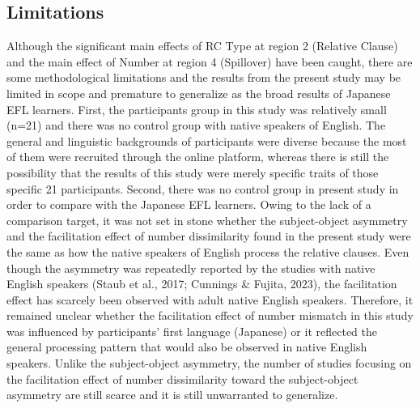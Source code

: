 \documentclass[
]{article}
\begin{document}
\subsection{Limitations}\label{limitations}

Although the significant main effects of RC Type at region 2 (Relative
Clause) and the main effect of Number at region 4 (Spillover) have been
caught, there are some methodological limitations and the results from
the present study may be limited in scope and premature to generalize as
the broad results of Japanese EFL learners. First, the participants
group in this study was relatively small (n=21) and there was no control
group with native speakers of English. The general and linguistic
backgrounds of participants were diverse because the most of them were
recruited through the online platform, whereas there is still the
possibility that the results of this study were merely specific traits
of those specific 21 participants. Second, there was no control group in
present study in order to compare with the Japanese EFL learners. Owing
to the lack of a comparison target, it was not set in stone whether the
subject-object asymmetry and the facilitation effect of number
dissimilarity found in the present study were the same as how the native
speakers of English process the relative clauses. Even though the
asymmetry was repeatedly reported by the studies with native English
speakers (Staub et al., 2017; Cunnings \& Fujita, 2023), the
facilitation effect has scarcely been observed with adult native English
speakers. Therefore, it remained unclear whether the facilitation effect
of number mismatch in this study was influenced by participants' first
language (Japanese) or it reflected the general processing pattern that
would also be observed in native English speakers. Unlike the
subject-object asymmetry, the number of studies focusing on the
facilitation effect of number dissimilarity toward the subject-object
asymmetry are still scarce and it is still unwarranted to generalize.
\end{document}
